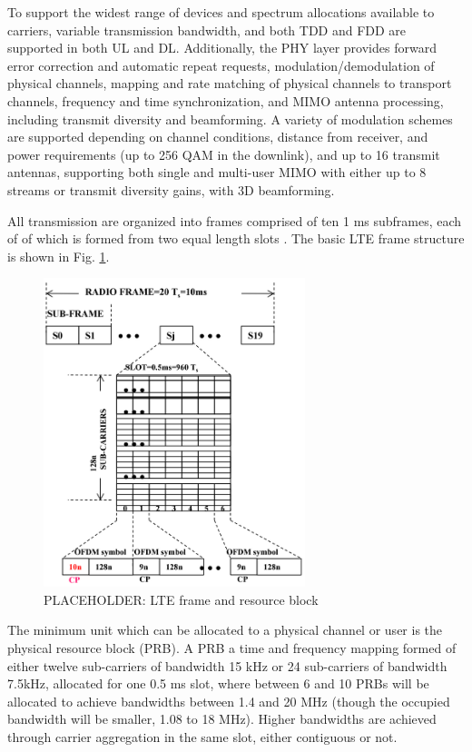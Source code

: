 To support the widest range of devices and spectrum allocations available to carriers, variable transmission bandwidth, and both TDD and FDD are supported in both UL and DL. Additionally, the PHY layer provides forward error correction and automatic repeat requests, modulation/demodulation of physical channels, mapping and rate matching of physical channels to transport channels, frequency and time synchronization, and MIMO antenna processing, including transmit diversity and beamforming.  A variety of modulation schemes are supported depending on channel conditions, distance from receiver, and power requirements (up to 256 QAM in the downlink), and up to 16 transmit antennas, supporting both single and multi-user MIMO with either up to 8 streams or transmit diversity gains, with 3D beamforming.

All transmission are organized into frames comprised of ten 1 ms subframes, each of of which is formed from two equal length slots \cite{tr36211}. The basic LTE frame structure is shown in Fig. \ref{lte:frame}.
\begin{figure}[!t]
	\centering
	\includegraphics[width=3in]{figures3/lte-frame}
	\caption{PLACEHOLDER: LTE frame and resource block}
	\label{lte:frame}
\end{figure}
The minimum unit which can be allocated to a physical channel or user is the physical resource block (PRB).  A PRB a time and frequency mapping formed of either twelve sub-carriers of bandwidth 15 kHz or 24 sub-carriers of bandwidth 7.5kHz, allocated for one 0.5 ms slot, where between 6 and 10 PRBs will be allocated to achieve bandwidths between 1.4 and 20 MHz (though the occupied bandwidth will be smaller, 1.08 to 18 MHz).  Higher bandwidths are achieved through carrier aggregation in the same slot, either contiguous or not.  

